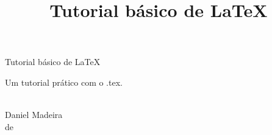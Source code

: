 \documentclass[a4paper,12pt,oneside]{book}
\title{Tutorial básico de \LaTeX} %
\author{\nomeautor} %
\date{\mesano} %
\newcommand{\nomeautor}{Daniel Madeira}
\newcommand{\mesano}{\DTMportugesmonthname{\the\month} de \the\year}
\newenvironment{folharosto}[1]
	{\begin{center}
		\vspace*{\fill}
		{\LARGE #1}\par
		\vspace{2cm}
    }
    {
		\vspace*{\fill}
		\\\large\nomeautor\\\small\mesano
		\thispagestyle{empty}
		\renewcommand{\thepage}{rosto}
    \end{center}
    }
\begin{document}
\begin{titlepage}
    \maketitle %
    \thispagestyle{fancy}
    \renewcommand{\thepage}{capa} %
\end{titlepage}

\pagecolor{gray!5!yellow!5} %

\begin{folharosto}{Tutorial básico de \LaTeX}
	Um tutorial prático com o .tex.
\end{folharosto}
\end{document}
